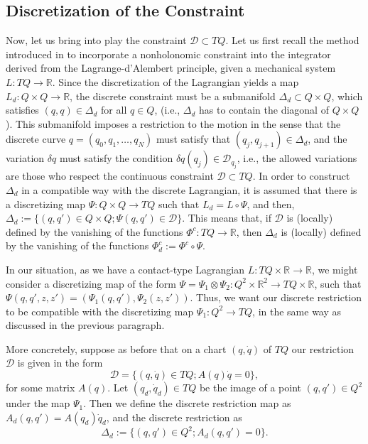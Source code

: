 \documentclass{aims}
\numberwithin{equation}{section}
\theoremstyle{definition}
\begin{document}
\subsection{Discretization of the Constraint}
Now, let us bring into play the constraint ${\mathcal D}\subset TQ$. Let us first recall the method introduced in \cite{cortes2001non} to incorporate a nonholonomic constraint into the integrator derived from the Lagrange-d'Alembert principle, given a mechanical system $L\colon TQ\to \mathbb{R}$. Since the discretization of the Lagrangian yields a map $L_d\colon Q\times Q\to \mathbb{R}$, the discrete constraint must be a submanifold $\Delta_d\subset Q\times Q$, which satisfies $(q, q)\in \Delta_d$ for all $q\in Q$,  {(i.e., $\Delta_d$ has to contain the diagonal of $Q\times Q$).} This submanifold imposes a restriction to the motion in the sense that the discrete curve $q = (q_0, q_1, \ldots, q_N)$ must satisfy that $(q_j, q_{j+1})\in \Delta_d$, and the variation $\delta q$ must satisfy the condition $\delta q(q_j)\in {\mathcal D}_{q_j}$, i.e., the allowed variations are those who respect the continuous constraint ${\mathcal D}\subset TQ$. In order to construct $\Delta_d$ in a compatible way with the discrete Lagrangian, it is assumed that there is a discretizing map $\Psi\colon Q\times Q\to TQ$ such that $L_d = L\circ \Psi$, and then, $\Delta_d:= \{(q, q')\in Q\times Q; \Psi(q, q')\in {\mathcal D}\}$. This means that, if ${\mathcal D}$ is (locally) defined by the vanishing of the functions $\Phi^c\colon TQ\to \mathbb{R}$, then $\Delta_d$ is (locally) defined by the vanishing of the functions $\Phi^c_d:= \Phi^c\circ\Psi$.

In our situation, as we have a  {contact-type} Lagrangian $L\colon TQ\times \mathbb{R}\to \mathbb{R}$, we might consider a discretizing map of the form $\Psi = \Psi_1\otimes \Psi_2\colon Q^2\times \mathbb{R}^2\to TQ\times \mathbb{R}$, such that $\Psi(q, q', z, z') = (\Psi_1(q, q'), \Psi_2(z, z'))$. Thus, we want our discrete restriction to be compatible with the discretizing map $\Psi_1\colon Q^2\to TQ$, in the same way as discussed in the previous paragraph.  

More concretely, suppose as before that on a chart $(q, \dot{q})$ of $TQ$ our restriction ${\mathcal D}$ is given in the form
\[{\mathcal D} = \{(q, \dot{q})\in TQ; A(q)\dot{q} = 0\},\]
for some matrix $A(q)$. Let $(q_d, \dot{q}_d)\in TQ$ be the image of a point $(q, q')\in Q^2$ under the map $\Psi_1$. Then we define the discrete restriction map as $A_d(q, q') = A(q_d)\dot{q}_d$, and the discrete restriction as
\[\Delta_d := \{(q, q')\in Q^2; A_d(q, q') = 0\}.\]
\end{document}
